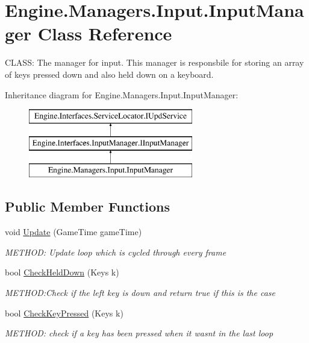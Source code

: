 \hypertarget{a00522}{}\section{Engine.\+Managers.\+Input.\+Input\+Manager Class Reference}
\label{a00522}


C\+L\+A\+SS\+: The manager for input. This manager is responsbile for storing an array of keys pressed down and also held down on a keyboard.  


Inheritance diagram for Engine.\+Managers.\+Input.\+Input\+Manager\+:\begin{figure}[H]
\begin{center}
\leavevmode
\includegraphics[height=3.000000cm]{d8/d14/a00522}
\end{center}
\end{figure}
\subsection*{Public Member Functions}
\begin{DoxyCompactItemize}
\item 
void \hyperlink{a00522_a7b0666f02640f9234e290938c4474e26}{Update} (Game\+Time game\+Time)
\begin{DoxyCompactList}\small\item\em M\+E\+T\+H\+OD\+: Update loop which is cycled through every frame \end{DoxyCompactList}\item 
bool \hyperlink{a00522_a40428e54a6265c8e18c51489321b1d4c}{Check\+Held\+Down} (Keys k)
\begin{DoxyCompactList}\small\item\em M\+E\+T\+H\+OD\+:Check if the left key is down and return true if this is the case \end{DoxyCompactList}\item 
bool \hyperlink{a00522_aeb5c9f3f44ec0f9468cf3ec6801b9b24}{Check\+Key\+Pressed} (Keys k)
\begin{DoxyCompactList}\small\item\em M\+E\+T\+H\+OD\+: check if a key has been pressed when it wasn\textquotesingle{}t in the last loop \end{DoxyCompactList}\end{DoxyCompactItemize}


